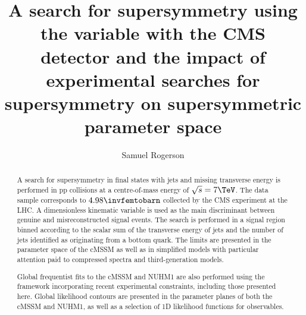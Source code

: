 \documentclass[]{mythesis}
\title{A search for supersymmetry using the \aT variable with the CMS detector
    and the impact of experimental searches for supersymmetry on supersymmetric
parameter space}
\author{Samuel Rogerson}
\begin{document}


\setcounter{page}{1}
  \maketitle
  \begin{abstract}

      A search for supersymmetry in final states with jets and missing
      transverse energy is performed in pp collisions at a centre-of-mass energy
      of $\sqrt{s}=7\TeV$. The data sample corresponds to $4.98\invfemtobarn$
      collected by the CMS experiment at the LHC.  A dimensionless kinematic
      variable is used as the main discriminant between genuine and
      misreconstructed signal events. The search is performed in a signal region
      binned according to the scalar sum of the transverse energy of jets and
      the number of jets identified as originating from a bottom quark.  The
      limits are presented in the parameter space of the \ac{cMSSM} as well as
      in simplified models with particular attention paid to compressed spectra
      and third-generation models.

      Global frequentist fits to the \ac{cMSSM} and NUHM1 are also performed
      using the \Mastercode framework incorporating recent experimental
      constraints, including those presented here.  Global likelihood contours
      are presented in the parameter planes of both the \ac{cMSSM} and NUHM1, as
      well as a selection of 1D likelihood functions for observables.
  
  \end{abstract}
  
  \tableofcontents \listoffigures

\newpage
{}
\setcounter{page}{1}
  
  
  
  
  
  

%
  
  
\end{document}
